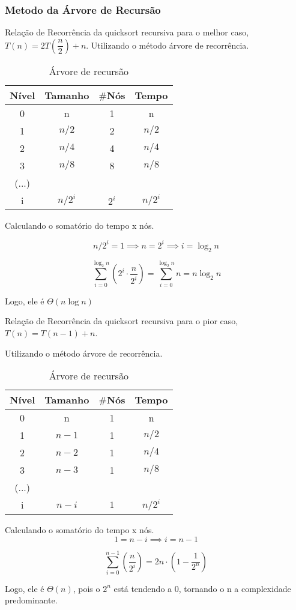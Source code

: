 \subsubsection{Metodo da Árvore de Recursão}
Relação de Recorrência da quicksort recursiva para o melhor caso, $T(n) = 2T\left(\dfrac{n}{2}\right) + n$. Utilizando o método árvore de recorrência.

\begin{table}[ht!]
    \centering
    \begin{tabular}{|c|c|c|c|}
    \hline
    \textbf{Nível} & \textbf{Tamanho} & $\#$\textbf{Nós} & \textbf{Tempo} \\ \hline
     0 & n & 1 & n \\ \hline
     1 & $n/2$ & 2 & $n/2$ \\ \hline
     2 & $n/4$ & 4 & $n/4$ \\ \hline
     3 & $n/8$ & 8 & $n/8$ \\ \hline
     (...) & & & \\ \hline
     i & $n/2^i$ & $2^i$ & $n/2^i$ \\ \hline 
    \end{tabular}  
    \caption{Árvore de recursão}
\end{table}

Calculando o somatório do tempo x nós.

\[
n/2^i = 1 \implies n = 2^i \implies i = \log_2{n}
\]

\[
\sum_{i=0}^{\log_2{n}} \left(2^i \cdot \dfrac{n}{2^i}\right) = \sum_{i=0}^{\log_2{n}} n = n \log_2{n}
\]

Logo, ele é $\Theta (n \log{n})$

\bigskip

Relação de Recorrência da quicksort recursiva para o pior caso, $T(n) = T(n - 1) + n$. 

Utilizando o método árvore de recorrência.

\begin{table}[ht!]
    \centering
    \begin{tabular}{|c|c|c|c|}
    \hline
    \textbf{Nível} & \textbf{Tamanho} & $\#$\textbf{Nós} & \textbf{Tempo} \\ \hline
     0 & n & 1 & n \\ \hline
     1 & $n - 1$ & 1 & $n/2$ \\ \hline
     2 & $n - 2$ & 1 & $n/4$ \\ \hline
     3 & $n - 3$ & 1 & $n/8$ \\ \hline
     (...) & & & \\ \hline
     i & $n - i$ & $1$ & $n/2^i$ \\ \hline 
    \end{tabular}  
    \caption{Árvore de recursão}
\end{table}

Calculando o somatório do tempo x nós. 
\[
1 = n -i \implies i = n - 1
\]

\[
\sum_{i = 0}^{n - 1} \left(\dfrac{n}{2^i}\right) = 2n \cdot \left(1 - \dfrac{1}{2^n}\right)
\]

Logo, ele é $\Theta (n)$, pois o $2^n$ está tendendo a 0, tornando o n a complexidade predominante.
